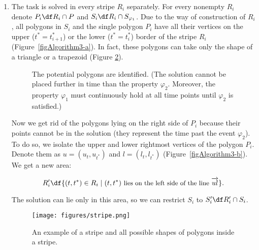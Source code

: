 \begin{enumerate}
\begin{enumerate}
			\item The task is solved in every stripe $R_{i}$ separately. For every nonempty $R_{i}$ denote $P_{i} \df R_{i} \cap P$ and $S_{i} \df R_{i} \cap S_{\varphi_1}$. Due to the way of construction of $R_{i}$, all polygons in $S_{i}$ and the single polygon $P_{i}$ have all their vertices on the upper ($t^\ast = t^\ast_{i+1}$) or the lower ($t^\ast = t^\ast_{i}$) border of the stripe $R_i$ (Figure~\ref{figAlgorithm3-a}). In fact, these polygons can take only the shape of a triangle or a trapezoid (Figure \ref{figStripe}).\\
			
\begin{figure}[h]
   \centering  
      	\caption{The potential polygons are identified. (The solution cannot be placed further in time than the property $\varphi_2$. Moreover, the property $\varphi_1$ must continuously hold at all time points until $\varphi_2$ is satisfied.)}
	\label{figAlgorithm3}    
    
\end{figure}				
\enlargethispage*{5mm}			
Now we get rid of the polygons lying on the right side of $P_{i}$ because their points cannot be in the solution (they represent the time past the event $\varphi_2$). To do so, we isolate the upper and lower rightmost vertices of the polygon $P_{i}$. Denote them as $u = (u_t, u_{t^\ast})$ and $l = (l_t, l_{t^\ast})$ (Figure~\ref{figAlgorithm3-b}). We get a new area:

$$R'_{i} \df \lbrace (t, t^\ast) \in R_{i} \mid (t, t^\ast) \textnormal{ \small lies on the left side of the line } \overrightarrow{ul} \rbrace.$$

 The solution can lie only in this area, so we can restrict $S_{i}$ to $S'_{i} \df R'_{i} \cap S_{i}$. 
			
\begin{figure}[h]
	\begin{center}
    	\texttt{[image: figures/stripe.png]}
      	\caption{An example of a stripe and all possible shapes of polygons inside a stripe.}
      	\label{figStripe}
    \end{center}
\end{figure}
			

\end{enumerate}
\end{enumerate}
